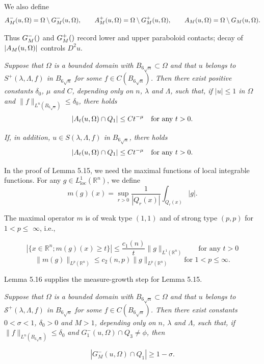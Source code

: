 We also define
\[
A^-_{M}(u,\Omega)=\Omega\setminus G^-_{M}(u,\Omega),
\qquad
A^+_{M}(u,\Omega)=\Omega\setminus G^+_{M}(u,\Omega),
\qquad
A_{M}(u,\Omega)=\Omega\setminus G_{M}(u,\Omega).
\]

Thus $G^-_{M}()$ and $G^+_{M}()$ record lower and upper paraboloid contacts; decay of $|A_{M}(u,\Omega)|$ controls $D^2u$.

\begin{lemma}\label{hanlin:ch05-lem-5-15} \textit{Suppose that $\Omega$ is a bounded domain with $B_{6\sqrt{n}}\subset\Omega$ and that $u$
belongs to $S^+(\lambda,\Lambda,f)$ in $B_{6\sqrt{n}}$ for some $f\in C(B_{6\sqrt{n}})$. Then there exist positive
constants $\delta_0$, $\mu$ and $C$, depending only on $n$, $\lambda$ and $\Lambda$, such that, if $|u|\le 1$ in $\Omega$ and
$\|f\|_{L^n(B_{6\sqrt{n}})}\le \delta_0$, there holds}
\[
|A_{t}(u,\Omega)\cap Q_1|\le Ct^{-\mu}\quad\text{for any }t>0.
\]

\textit{If, in addition, $u\in S(\lambda,\Lambda,f)$ in $B_{6\sqrt{n}}$, there holds}
\[
|A_{t}(u,\Omega)\cap Q_1|\le Ct^{-\mu}\quad\text{for any }t>0.
\]
\end{lemma}

In the proof of Lemma 5.15, we need the maximal functions of local integrable
functions. For any $g\in L^1_{\mathrm{loc}}(\mathbb{R}^n)$, we define
\[
m(g)(x)=\sup_{r>0}\frac{1}{|Q_r(x)|}\int_{Q_r(x)}|g|.
\]

The maximal operator $m$ is of weak type $(1,1)$ and of strong type $(p,p)$ for $1<p\leq$
$\infty$, i.e.,

\[
|\{x\in\mathbb{R}^n;m(g)(x)\geq t\}|\leq \frac{c_1(n)}{t}\|g\|_{L^1(\mathbb{R}^n)} \qquad \text{for any } t>0
\]
\[
\|m(g)\|_{L^p(\mathbb{R}^n)}\leq c_2(n,p)\|g\|_{L^p(\mathbb{R}^n)} \qquad \text{for } 1<p\leq \infty.
\]

Lemma 5.16 supplies the measure-growth step for Lemma 5.15.

\begin{lemma}\label{hanlin:ch05-lem-5-16} \textit{Suppose that $\Omega$ is a bounded domain with $B_{6\sqrt{n}}\subset \Omega$ and that $u$ belongs to $\mathcal{S}^+(\lambda,\Lambda,f)$ in $B_{6\sqrt{n}}$ for some $f\in C(B_{6\sqrt{n}})$. Then there exist constants $0<\sigma<1$, $\delta_0>0$ and $M>1$, depending only on $n$, $\lambda$ and $\Lambda$, such that, if $\|f\|_{L^n(B_{6\sqrt{n}})}\leq \delta_0$ and $G_1^-(u,\Omega)\cap Q_3
\neq \phi$, then}

\[
|G_M^-(u,\Omega)\cap Q_1|\geq 1-\sigma.
\]
\end{lemma}

